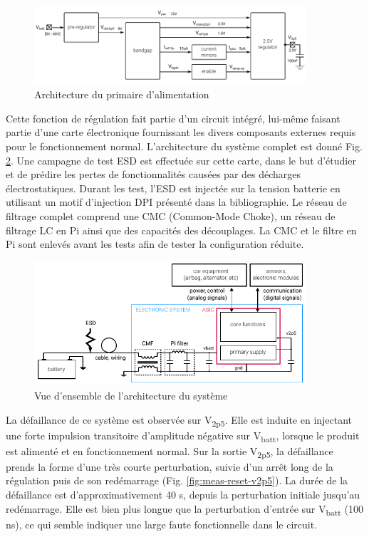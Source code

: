 \begin{figure}[!h]
  \centering
  \includegraphics[width=0.9\textwidth]{src/1/figures/monitored_function.pdf}
  \caption{Architecture du primaire d'alimentation}
  \label{fig:monitored_function}
\end{figure}

Cette fonction de régulation fait partie d'un circuit intégré, lui-même faisant partie d'une carte électronique fournissant les divers composants externes requis pour le fonctionnement normal.
L'architecture du système complet est donné Fig. \ref{fig:system_architecture}.
Une campagne de test ESD est effectuée sur cette carte, dans le but d'étudier et de prédire les pertes de fonctionnalités causées par des décharges électrostatiques.
Durant les test, l'ESD est injectée sur la tension batterie en utilisant un motif d'injection DPI \cite{iec62132-4} présenté dans la bibliographie.
Le réseau de filtrage complet comprend une CMC (Common-Mode Choke), un réseau de filtrage LC en Pi ainsi que des capacités des découplages.
La CMC et le filtre en Pi sont enlevés avant les tests afin de tester la configuration réduite.

\begin{figure}[!h]
  \centering
  \includegraphics[width=0.9\textwidth]{src/1/figures/architecture_system.pdf}
  \caption{Vue d'ensemble de l'architecture du système}
  \label{fig:system_architecture}
\end{figure}


La défaillance de ce système est observée sur V\textsubscript{2p5}.
Elle est induite en injectant une forte impulsion transitoire d'amplitude négative sur V\textsubscript{batt}, lorsque le produit est alimenté et en fonctionnement normal.
Sur la sortie V\textsubscript{2p5}, la défaillance prends la forme d'une très courte perturbation, suivie d'un arrêt long de la régulation puis de son redémarrage (Fig. \ref{fig:meas-reset-v2p5}).
La durée de la défaillance est d'approximativement 40 \textmu{}s, depuis la perturbation initiale jusqu'au redémarrage.
Elle est bien plus longue que la perturbation d'entrée sur V\textsubscript{batt} (100 ns), ce qui semble indiquer une large faute fonctionnelle dans le circuit.

